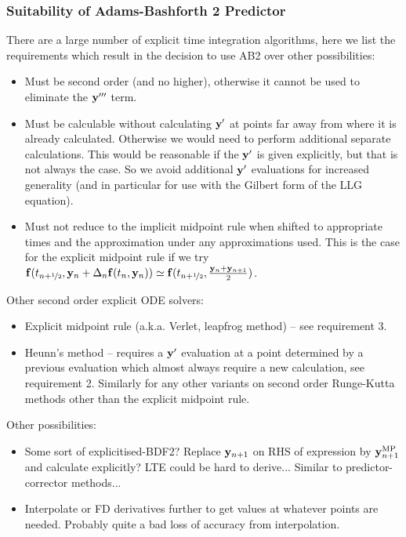 \subsubsection{Suitability of Adams-Bashforth 2 Predictor}

There are a large number of explicit time integration algorithms, here we list the requirements which result in the decision to use AB2 over other possibilities:
\begin{itemize}
\item Must be second order (and no higher), otherwise it cannot be used to eliminate the $\mathbf{y}'''$ term.

\item Must be calculable without calculating $\mathbf{y}'$ at points far away from where it is already calculated.
  Otherwise we would need to perform additional separate calculations.
  This would be reasonable if the $\mathbf{y}'$ is given explicitly, but that is not always the case.
  So we avoid additional $\mathbf{y}'$ evaluations for increased generality (and in particular for use with the Gilbert form of the LLG equation).

\item Must not reduce to the implicit midpoint rule when shifted to appropriate times and the approximation under any approximations used.
  This is the case for the explicit midpoint rule if we try ${\mathbf{f}}(t_{n+\nicefrac{1}{2}}, \mathbf{y}_n + \Delta_{n} {\mathbf{f}}(t_n, \mathbf{y}_n)) \simeq {\mathbf{f}}(t_{n+\nicefrac{1}{2}}, \frac{\mathbf{y}_n + \mathbf{y}_{n+1}}{2})$.
\end{itemize}

Other second order explicit ODE solvers:
\begin{itemize}
\item Explicit midpoint rule (a.k.a. Verlet, leapfrog method) -- see requirement 3.
\item Heunn's method -- requires a $\mathbf{y}'$ evaluation at a point determined by a previous evaluation which almost always require a new calculation, see requirement 2. Similarly for any other variants on second order Runge-Kutta methods other than the explicit midpoint rule.
\end{itemize}


Other possibilities:
\begin{itemize}
\item Some sort of explicitised-BDF2? Replace $\mathbf{y}_{n+1}$ on RHS of expression by $\mathbf{y}_{n+1}^{\text{MP}}$ and calculate explicitly? LTE could be hard to derive... Similar to predictor-corrector methods...
\item Interpolate or FD derivatives further to get values at whatever points are needed. Probably quite a bad loss of accuracy from interpolation.
\end{itemize}



